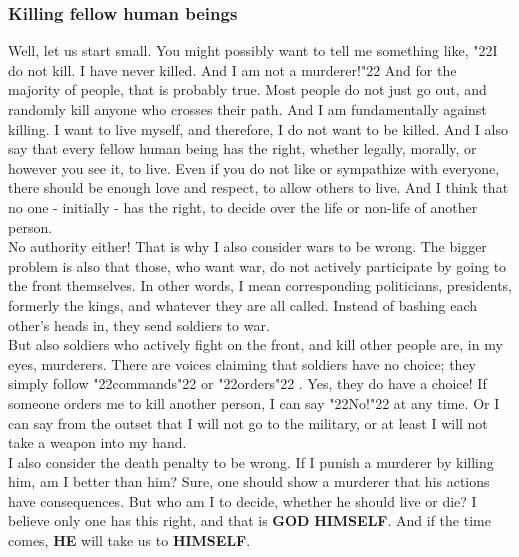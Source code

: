 \documentclass[10pt,a5paper]{article}
\newcommand{\God}[0]{\textbf{GOD}}
\newcommand{\He}[0]{\textbf{HE}}
\newcommand{\Himself}[0]{\textbf{HIMSELF}}
\newcommand{\q}[1]{\char"22{#1}\char"22 }
\begin{document}
	\subsubsection{Killing fellow human beings}
		Well,
		let us start small.
		You might possibly want to tell me something like,
		\q{I do not kill.
		I have never killed.
		And I am not a murderer!}
		And for the majority of people,
		that is probably true.
		Most people do not just go out,
		and randomly kill anyone who crosses their path.
		And I am fundamentally against killing.
		I want to live myself,
		and therefore,
		I do not want to be killed.
		And I also say that every fellow human being has the right,
		whether legally,
		morally,
		or however you see it,
		to live.
		Even if you do not like or sympathize with everyone,
		there should be enough love and respect,
		to allow others to live.
		And I think that no one - initially - has the right,
		to decide over the life or non-life of another person.
		\\
		No authority either!
		That is why I also consider wars to be wrong.
		The bigger problem is also that those,
		who want war,
		do not actively participate by going to the front themselves.
		In other words,
		I mean corresponding politicians,
		presidents,
		formerly the kings,
		and whatever they are all called.
		Instead of bashing each other's heads in,
		they send soldiers to war.
		\\
		But also soldiers who actively fight on the front,
		and kill other people are,
		in my eyes,
		murderers.
		There are voices claiming that soldiers have no choice;
		they simply follow \q{commands} or \q{orders}.
		Yes,
		they do have a choice!
		If someone orders me to kill another person,
		I can say \q{No!} at any time.
		Or I can say from the outset that I will not go to the military,
		or at least I will not take a weapon into my hand.
		\\
		I also consider the death penalty to be wrong.
		If I punish a murderer by killing him,
		am I better than him?
		Sure,
		one should show a murderer that his actions have consequences.
		But who am I to decide,
		whether he should live or die?
		I believe only one has this right,
		and that is {\God} {\Himself}.
		And if the time comes,
		{\He} will take us to {\Himself}.
		
\end{document}
